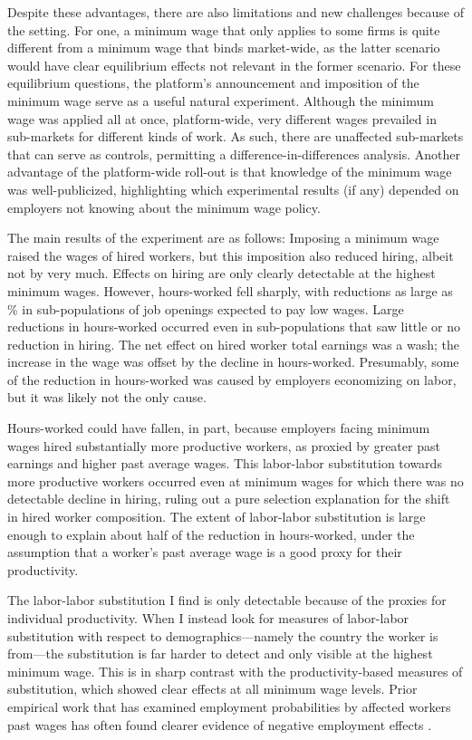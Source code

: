 \documentclass[AER]{AEA}
\begin{document}
Despite these advantages, there are also limitations and new challenges because of the setting. 
For one, a minimum wage that only applies to some firms is quite different from a minimum wage that binds market-wide, as the latter scenario would have clear equilibrium effects not relevant in the former scenario. 
For these equilibrium questions, the platform's announcement and imposition of the minimum wage serve as a useful natural experiment.
Although the minimum wage was applied all at once, platform-wide, very different wages prevailed in sub-markets for different kinds of work.
As such, there are unaffected sub-markets that can serve as controls, permitting a difference-in-differences analysis.
Another advantage of the platform-wide roll-out is that knowledge of the minimum wage was well-publicized, highlighting which experimental results (if any) depended on employers not knowing about the minimum wage policy.

The main results of the experiment are as follows:
Imposing a minimum wage raised the wages of hired workers, but this imposition also reduced hiring, albeit not by very much.
Effects on hiring are only clearly detectable at the highest minimum wages.
However, hours-worked fell sharply, with reductions as large as \HoursReduction{}\% in sub-populations of job openings expected to pay low wages.
Large reductions in hours-worked occurred even in sub-populations that saw little or no reduction in hiring. 
The net effect on hired worker total earnings was a wash; the increase in the wage was offset by the decline in hours-worked.
Presumably, some of the reduction in hours-worked was caused by employers economizing on labor, but it was likely not the only cause.  

Hours-worked could have fallen, in part, because employers facing minimum wages hired substantially more productive workers, as proxied by greater past earnings and higher past average wages. 
This labor-labor substitution towards more productive workers occurred even at minimum wages for which there was no detectable decline in hiring, ruling out a pure selection explanation for the shift in hired worker composition.
The extent of labor-labor substitution is large enough to explain about half of the reduction in hours-worked, under the assumption that a worker's past average wage is a good proxy for their productivity.

The labor-labor substitution I find is only detectable because of the proxies for individual productivity.
When I instead look for measures of labor-labor substitution with respect to demographics---namely the country the worker is from---the substitution is far harder to detect and only visible at the highest minimum wage. 
This is in sharp contrast with the productivity-based measures of substitution, which showed clear effects at all minimum wage levels.
Prior empirical work that has examined employment probabilities by affected workers past wages has often found clearer evidence of negative employment effects \citep{abowd2000}.
\end{document}
